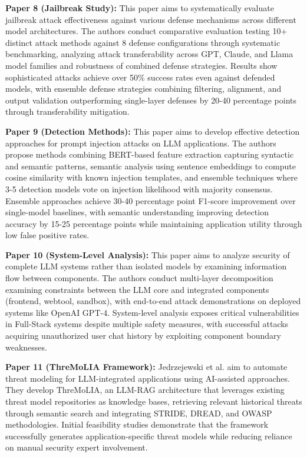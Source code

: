 \documentclass[conference]{IEEEtran}
\begin{document}
\textbf{Paper 8 (Jailbreak Study):} This paper aims to systematically evaluate jailbreak attack effectiveness against various defense mechanisms across different model architectures. The authors conduct comparative evaluation testing 10+ distinct attack methods against 8 defense configurations through systematic benchmarking, analyzing attack transferability across GPT, Claude, and Llama model families and robustness of combined defense strategies. Results show sophisticated attacks achieve over 50\% success rates even against defended models, with ensemble defense strategies combining filtering, alignment, and output validation outperforming single-layer defenses by 20-40 percentage points through transferability mitigation.

\textbf{Paper 9 (Detection Methods):} This paper aims to develop effective detection approaches for prompt injection attacks on LLM applications. The authors propose methods combining BERT-based feature extraction capturing syntactic and semantic patterns, semantic analysis using sentence embeddings to compute cosine similarity with known injection templates, and ensemble techniques where 3-5 detection models vote on injection likelihood with majority consensus. Ensemble approaches achieve 30-40 percentage point F1-score improvement over single-model baselines, with semantic understanding improving detection accuracy by 15-25 percentage points while maintaining application utility through low false positive rates.

\textbf{Paper 10 (System-Level Analysis):} This paper aims to analyze security of complete LLM systems rather than isolated models by examining information flow between components. The authors conduct multi-layer decomposition examining constraints between the LLM core and integrated components (frontend, webtool, sandbox), with end-to-end attack demonstrations on deployed systems like OpenAI GPT-4. System-level analysis exposes critical vulnerabilities in Full-Stack systems despite multiple safety measures, with successful attacks acquiring unauthorized user chat history by exploiting component boundary weaknesses.

\textbf{Paper 11 (ThreMoLIA Framework):} Jedrzejewski et al. aim to automate threat modeling for LLM-integrated applications using AI-assisted approaches. They develop ThreMoLIA, an LLM-RAG architecture that leverages existing threat model repositories as knowledge bases, retrieving relevant historical threats through semantic search and integrating STRIDE, DREAD, and OWASP methodologies. Initial feasibility studies demonstrate that the framework successfully generates application-specific threat models while reducing reliance on manual security expert involvement.
\end{document}
